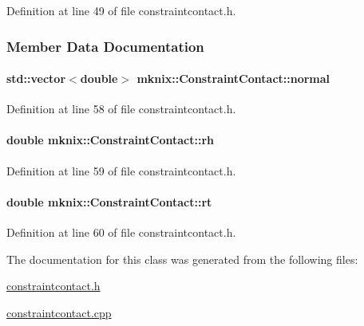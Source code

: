 Definition at line 49 of file constraintcontact.\+h.



\subsubsection{Member Data Documentation}
\hypertarget{classmknix_1_1_constraint_contact_a06ba5460d950b98b85226e7b9b520df2}{}
\paragraph[{normal}]{\setlength{\rightskip}{0pt plus 5cm}std\+::vector$<$double$>$ mknix\+::\+Constraint\+Contact\+::normal\hspace{0.3cm}{\ttfamily [protected]}}\label{classmknix_1_1_constraint_contact_a06ba5460d950b98b85226e7b9b520df2}


Definition at line 58 of file constraintcontact.\+h.

\hypertarget{classmknix_1_1_constraint_contact_a86b0413ea70c74a38f8610a88cba48c6}{}
\paragraph[{rh}]{\setlength{\rightskip}{0pt plus 5cm}double mknix\+::\+Constraint\+Contact\+::rh\hspace{0.3cm}{\ttfamily [protected]}}\label{classmknix_1_1_constraint_contact_a86b0413ea70c74a38f8610a88cba48c6}


Definition at line 59 of file constraintcontact.\+h.

\hypertarget{classmknix_1_1_constraint_contact_a0a2b6bbee4925e12f4921aa58f0f3426}{}
\paragraph[{rt}]{\setlength{\rightskip}{0pt plus 5cm}double mknix\+::\+Constraint\+Contact\+::rt\hspace{0.3cm}{\ttfamily [protected]}}\label{classmknix_1_1_constraint_contact_a0a2b6bbee4925e12f4921aa58f0f3426}


Definition at line 60 of file constraintcontact.\+h.



The documentation for this class was generated from the following files\+:\begin{DoxyCompactItemize}
\item 
\hyperlink{constraintcontact_8h}{constraintcontact.\+h}\item 
\hyperlink{constraintcontact_8cpp}{constraintcontact.\+cpp}\end{DoxyCompactItemize}
